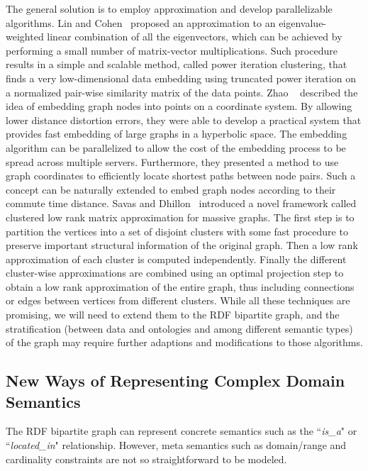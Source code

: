 The general solution is to employ approximation and develop parallelizable algorithms. Lin and Cohen~\cite{LinEtal2010ICML} proposed an approximation to an eigenvalue-weighted linear combination of all the eigenvectors, which can be achieved by performing a small number of matrix-vector multiplications.  Such procedure results in a simple and scalable method, called power iteration clustering, that finds a very low-dimensional data embedding using truncated power iteration on a normalized pair-wise similarity matrix of the data points. Zhao \etal~\cite{ZhaoEtal2011Eff} described the idea of embedding graph nodes into points on a coordinate system. By allowing lower distance distortion errors, they were able to develop a practical system that provides fast embedding of large graphs in a hyperbolic space. The embedding algorithm can be parallelized to allow the cost of the embedding process to be spread across multiple servers. Furthermore, they presented a method to use graph coordinates to efficiently locate shortest paths between node pairs. Such a concept can be naturally extended to embed graph nodes according to their commute time distance. Savas and Dhillon~\cite{SavasEtal2011Clu} introduced a novel framework called clustered low rank matrix approximation for massive graphs. The first step is to partition the vertices into a set of disjoint clusters with some fast procedure to preserve important structural information of the original graph. Then a low rank approximation of each cluster is computed independently. Finally the different cluster-wise approximations are combined using an optimal projection step to obtain a low rank approximation of the entire graph, thus including connections or edges between vertices from different clusters. While all these techniques are promising, we will need to extend them to the RDF bipartite graph, and the stratification (between data and ontologies and among different semantic types) of the graph may require further adaptions and modifications to those algorithms.

\subsection{New Ways of Representing Complex Domain Semantics}
The RDF bipartite graph can represent concrete semantics such as the ``\emph{is\_a}" or ``\emph{located\_in}" relationship. However, meta semantics such as domain/range and cardinality constraints are not so straightforward to be modeled.

